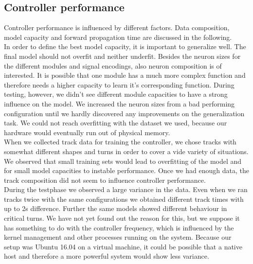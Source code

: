 \documentclass[10pt,a4paper,twoside,journal]{IEEEtran}
\begin{document}
\subsection{Controller performance}
Controller performance is influenced by different factors. Data composition, model capacity and forward propagation time are discussed in the following. \\
In order to define the best model capacity, it is important to generalize well. The final model should not overfit and neither underfit. Besides the neuron sizes for the different modules and signal encodings, also neuron composition is of interested. It is possible that one module has a much more complex function and therefore needs a higher capacity to learn it's corresponding function. During testing, however, we didn't see different module capacities to have a strong influence on the model. We increased the neuron sizes from a bad performing configuration until we hardly discovered any improvements on the generalization task. We could not reach overfitting with the dataset we used, because our hardware would eventually run out of physical memory.\\
When we collected track data for training the controller, we chose tracks with somewhat different shapes and turns in order to cover a vide variety of situations. We observed that small training sets would lead to overfitting of the model and for small model capacities to instable performance. Once we had enough data, the track composition did not seem to influence controller performance. \\
During the testphase we observed a large variance in the data. Even when we ran tracks twice with the same configurations we obtained different track times with up to 2s difference. Further the same models showed different behaviour in critical turns. We have not yet found out the reason for this, but we suppose it has something to do with the controller frequency, which is influenced by the kernel management and other processes running on the system. Because our setup was Ubuntu 16.04 on a virtual machine, it could be possible that a native host and therefore a more powerful system would show less variance. \\
\end{document}
